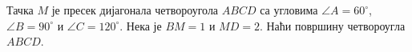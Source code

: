\problem
Тачка $M$ је пресек дијагонала четвороугола $ABCD$ са угловима 
$\angle A = 60^{\circ}$, $\angle B = 90^{\circ}$ и $\angle C = 120^{\circ}$.
Нека је $BM = 1$ и $MD = 2$. 
Наћи површину четвороугла $ABCD$.

\solution

\endproblem

